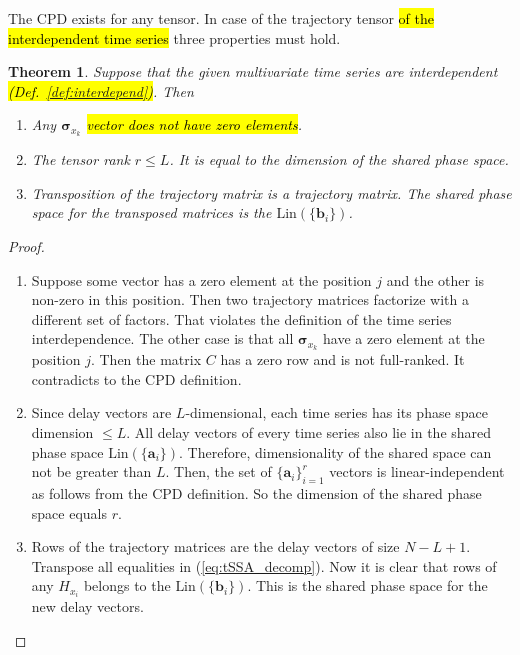\documentclass[referee, pdflatex, sn-mathphys-num]{sn-jnl}
\theoremstyle{definition}
\theoremstyle{plain}
\newtheorem{Th}{Theorem}
\begin{document}
	The CPD exists for any tensor. In case of the trajectory tensor \hl{of the interdependent  time series} three properties must hold.
	
	\begin{Th}\label{th:cpd_phase}
		Suppose that the given multivariate time series are interdependent \hl{(Def.~{\ref{def:interdepend}})}. Then
		
		\begin{enumerate}
			\item Any $ \boldsymbol{\sigma}_{x_k} $ \hl{vector does not have zero elements}.
			\item The tensor rank $ r \le L $. It is equal to the dimension of the shared phase space.
			\item Transposition of the trajectory matrix is a trajectory matrix. The shared phase space for the transposed matrices is the $ \text{Lin}(\{\mathbf{b}_i\}) $.
		\end{enumerate}
	\end{Th}
	
	\begin{proof}
		\begin{enumerate}
			\item Suppose some vector has a zero element at the position $ j $ and the other is non-zero in this position. Then two trajectory matrices factorize with a different set of factors. That violates the definition of the time series interdependence. The other case is that all $ \boldsymbol{\sigma}_{x_k} $ have a zero element at the position $ j $. Then the matrix $ C $ has a zero row and is not full-ranked. It contradicts to the CPD definition.
			\item Since delay vectors are $ L $-dimensional, each time series has its phase space dimension $ \le L $. All delay vectors of every time series also lie in the shared phase space $ \text{Lin}(\{\mathbf{a}_i\}) $. Therefore, dimensionality of the shared space can not be greater than $ L $. Then, the set of $ \{\mathbf{a}_i\}_{i=1}^r $ vectors is linear-independent as follows from the CPD definition. So the dimension of the shared phase space equals $ r $.
			\item Rows of the trajectory matrices are the delay vectors of size $ N - L + 1 $. Transpose all equalities in (\ref{eq:tSSA_decomp}). Now it is clear that rows of any $ H_{x_i} $ belongs to the $ \text{Lin}(\{\mathbf{b}_i\}) $. This is the shared phase space for the new delay vectors.
		\end{enumerate}
	\end{proof}
\end{document}
